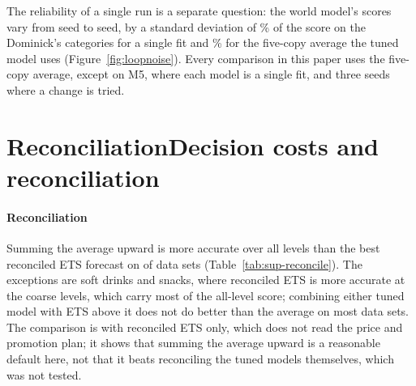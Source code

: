 

The reliability of a single run is a separate question: the world model's
scores vary from seed to seed, by a standard deviation of \loopSeedSdOne\% of the score on
the Dominick's categories for a single fit and \loopSeedSdFive\% for the five-copy average
the tuned model uses (Figure~\ref{fig:loopnoise}). Every comparison in this paper
uses the five-copy average, except on M5, where each model is a single fit, and
three seeds where a change is tried.




\secbarrier
\section{\ifjournal Reconciliation\else Decision costs and reconciliation\fi}
\label{sec:sup-decisions}

\ifjournal\else

\fi

\paragraph{Reconciliation}
Summing the average upward is more accurate over all levels than the best
reconciled ETS forecast on \supAvgBeatsEts{} of \supReconSets{} data sets
(Table~\ref{tab:sup-reconcile}). The exceptions are soft drinks and snacks,
where reconciled ETS is more accurate at the coarse levels, which carry most of
the all-level score; combining either tuned model with ETS above it does not do
better than the average on most data sets. The comparison is with
reconciled ETS only, which does not read the price and promotion plan; it shows
that summing the average upward is a reasonable default here, not that it beats
reconciling the tuned models themselves, which was not tested.



